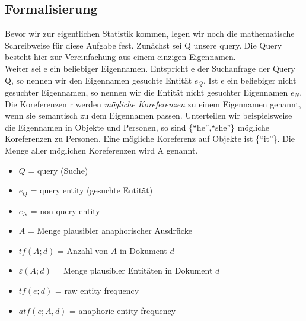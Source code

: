 \subsection{Formalisierung}
Bevor wir zur eigentlichen Statistik kommen, legen wir noch die mathematische Schreibweise für diese Aufgabe fest.
Zunächst sei Q unsere query. Die Query besteht hier zur Vereinfachung aus einem einzigen Eigennamen.\\
Weiter sei e ein beliebiger Eigennamen. Entspricht e der Suchanfrage der Query Q, so nennen wir den Eigennamen gesuchte Entität $e_Q$. Ist e ein beliebiger nicht gesuchter Eigennamen, so nennen wir die Entität nicht gesuchter Eigennamen $e_N$.\\
Die Koreferenzen r werden \textit{mögliche Koreferenzen} zu einem Eigennamen genannt, wenn sie semantisch zu dem Eigennamen passen. Unterteilen wir beispielsweise die Eigennamen in Objekte und Personen, so sind \{``he'',``she''\} mögliche Koreferenzen zu Personen. Eine mögliche Koreferenz auf Objekte ist \{``it''\}. Die Menge aller möglichen Koreferenzen wird A genannt.\\




 \begin{itemize}
	\item $Q$ = query (Suche)
	\item $e_Q$ = query entity (gesuchte Entität)
	\item $e_N$ = non-query entity
	\item $A$ = Menge plausibler anaphorischer Ausdrücke
	\item $tf(A;d)$ = Anzahl von $A$ in Dokument $d$
	\item $\varepsilon (A;d)$ = Menge plausibler Entitäten in Dokument $d$
	\item $tf(e;d)$ = raw entity frequency
	\item $atf(e;A,d)$ = anaphoric entity frequency
  \end{itemize}
